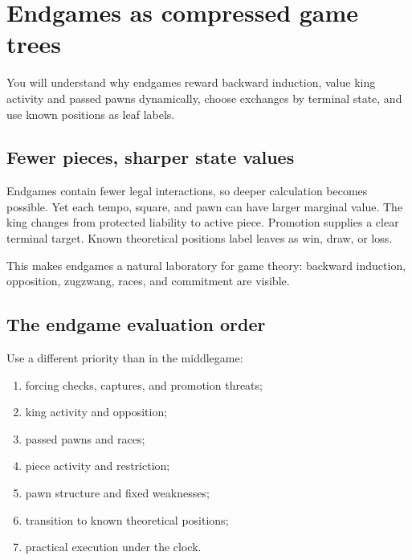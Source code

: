 
\chapter{Endgames as compressed game trees}
\begin{learningbox}
You will understand why endgames reward backward induction, value king activity and passed pawns dynamically, choose exchanges by terminal state, and use known positions as leaf labels.
\end{learningbox}

\section{Fewer pieces, sharper state values}
Endgames contain fewer legal interactions, so deeper calculation becomes possible. Yet each tempo, square, and pawn can have larger marginal value. The king changes from protected liability to active piece. Promotion supplies a clear terminal target. Known theoretical positions label leaves as win, draw, or loss.

This makes endgames a natural laboratory for game theory: backward induction, opposition, zugzwang, races, and commitment are visible.

\section{The endgame evaluation order}
Use a different priority than in the middlegame:

\begin{enumerate}[label=\textbf{\arabic*.},leftmargin=2em]
\item forcing checks, captures, and promotion threats;
\item king activity and opposition;
\item passed pawns and races;
\item piece activity and restriction;
\item pawn structure and fixed weaknesses;
\item transition to known theoretical positions;
\item practical execution under the clock.
\end{enumerate}

